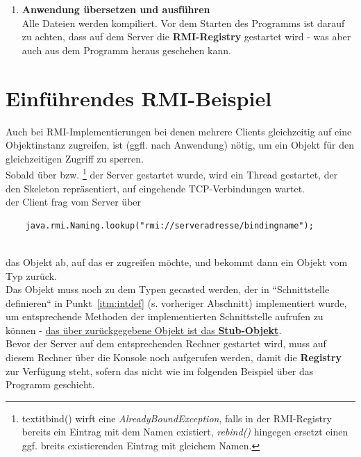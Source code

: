 \begin{enumerate}
    \item \textbf{Anwendung übersetzen und ausführen}\\
    \noindent
    Alle Dateien werden kompiliert.
    Vor dem Starten des Programms ist darauf zu achten, dass auf dem Server die \textbf{RMI-Registry} gestartet wird - was aber auch aus dem Programm heraus geschehen kann.
\end{enumerate}

\section{Einführendes RMI-Beispiel}

Auch bei RMI-Implementierungen bei denen mehrere Clients gleichzeitig auf eine Objektinstanz zugreifen, ist (ggfl. nach Anwendung)  nötig, um ein Objekt für den gleichzeitigen Zugriff zu sperren.\\

\noindent
Sobald über  bzw. \footnote{
textit{bind()} wirft eine \textit{AlreadyBoundException}, falls in der RMI-Registry bereits ein Eintrag mit dem Namen existiert, \textit{rebind()} hingegen ersetzt einen ggf. breits existierenden Eintrag mit gleichem Namen.
} der Server gestartet wurde, wird ein Thread gestartet, der den Skeleton repräsentiert, auf eingehende TCP-Verbindungen wartet.\\

\noindent
der Client frag vom Server über

\begin{verbatim}
    java.rmi.Naming.lookup("rmi://serveradresse/bindingname");
\end{verbatim}\\

das Objekt ab, auf das er zugreifen möchte, und bekommt dann ein Objekt vom Typ  zurück.\\
Das Objekt muss noch zu dem Typen gecasted werden, der in ``Schnittstelle definieren`` in Punkt~\ref{itm:intdef} (s. vorheriger Abschnitt) implementiert wurde, um entsprechende Methoden der implementierten Schnittstelle aufrufen zu können - \ul{das über }\ul{ zurückgegebene Objekt ist das \textbf{Stub-Objekt}}.\\

\noindent
Bevor der Server auf dem entsprechenden Rechner gestartet wird, muss auf diesem Rechner über die Konsole noch  aufgerufen werden, damit die \textbf{Registry} zur Verfügung steht, sofern das nicht wie im folgenden Beispiel über das Programm geschieht.\\

